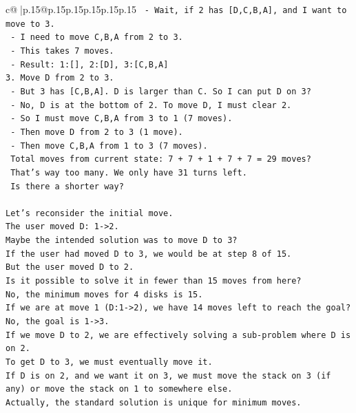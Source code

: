 \documentclass{article}
\begin{document}
{\begin{supertabular}{c@{$\;$}|p{.15\linewidth}@{}p{.15\linewidth}p{.15\linewidth}p{.15\linewidth}p{.15\linewidth}p{.15\linewidth}}
{{{\texttt{   {-} Wait, if 2 has {[}D,C,B,A{]}, and I want to move to 3.} \\
\texttt{   {-} I need to move C,B,A from 2 to 3.} \\
\texttt{   {-} This takes 7 moves.} \\
\texttt{   {-} Result: 1:{[}{]}, 2:{[}D{]}, 3:{[}C,B,A{]}} \\
\texttt{3. Move D from 2 to 3.} \\
\texttt{   {-} But 3 has {[}C,B,A{]}. D is larger than C. So I can put D on 3?} \\
\texttt{   {-} No, D is at the bottom of 2. To move D, I must clear 2.} \\
\texttt{   {-} So I must move C,B,A from 3 to 1 (7 moves).} \\
\texttt{   {-} Then move D from 2 to 3 (1 move).} \\
\texttt{   {-} Then move C,B,A from 1 to 3 (7 moves).} \\
\texttt{   Total moves from current state: 7 + 7 + 1 + 7 + 7 = 29 moves?} \\
\texttt{   That's way too many. We only have 31 turns left.} \\
\texttt{   Is there a shorter way?} \\
\\ 
\texttt{Let's reconsider the initial move.} \\
\texttt{The user moved D: 1{-}>2.} \\
\texttt{Maybe the intended solution was to move D to 3?} \\
\texttt{If the user had moved D to 3, we would be at step 8 of 15.} \\
\texttt{But the user moved D to 2.} \\
\texttt{Is it possible to solve it in fewer than 15 moves from here?} \\
\texttt{No, the minimum moves for 4 disks is 15.} \\
\texttt{If we are at move 1 (D:1{-}>2), we have 14 moves left to reach the goal?} \\
\texttt{No, the goal is 1{-}>3.} \\
\texttt{If we move D to 2, we are effectively solving a sub{-}problem where D is on 2.} \\
\texttt{To get D to 3, we must eventually move it.} \\
\texttt{If D is on 2, and we want it on 3, we must move the stack on 3 (if any) or move the stack on 1 to somewhere else.} \\
\texttt{Actually, the standard solution is unique for minimum moves.} \\
}}}
\end{supertabular}}
\end{document}
